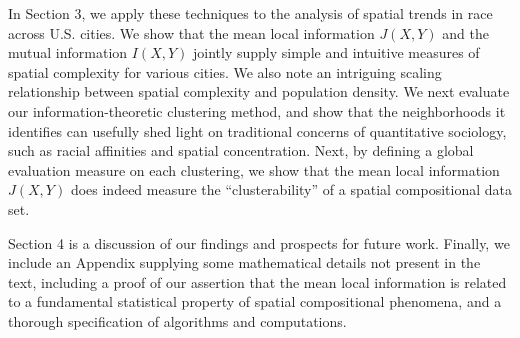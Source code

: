 	In Section 3, we apply these techniques to the analysis of spatial trends in race across U.S. cities. We show that the mean local information $J(X,Y)$ and the mutual information $I(X,Y)$ jointly supply simple and intuitive measures of spatial complexity for various cities. We also note an intriguing scaling relationship between spatial complexity and population density. We next evaluate our information-theoretic clustering method, and show that the neighborhoods it identifies can usefully shed light on traditional concerns of quantitative sociology, such as racial affinities and spatial concentration. Next, by defining a global evaluation measure on each clustering, we show that the mean local information $J(X,Y)$ does indeed measure the ``clusterability'' of a spatial compositional data set. 

	Section 4 is a discussion of our findings and prospects for future work. Finally, we include an Appendix supplying some mathematical details not present in the text, including a proof of our assertion that the mean local information is related to a fundamental statistical property of spatial compositional phenomena, and a thorough specification of algorithms and computations. 


